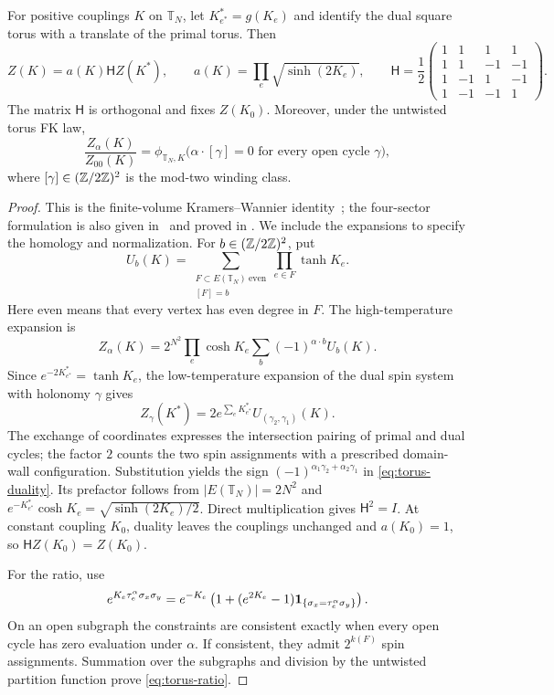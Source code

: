 \begin{lemma}
\label{lem:torus-duality}
For positive couplings $K$ on $\mathbb T_N$, let
$K^*_{e^*}=g(K_e)$ and identify the dual square torus with a translate
of the primal torus. Then
\begin{equation}
 Z(K)=a(K)\mathsf H Z(K^*),\qquad
 a(K)=\prod_e\sqrt{\sinh(2K_e)},\qquad
 \mathsf H=\frac12
 \begin{pmatrix}
 1&1&1&1\\
 1&1&-1&-1\\
 1&-1&1&-1\\
 1&-1&-1&1
 \end{pmatrix}.
 \label{eq:torus-duality}
\end{equation}
The matrix $\mathsf H$ is orthogonal and fixes $Z(K_0)$. Moreover,
under the untwisted torus FK law,
\begin{equation}
 \frac{Z_\alpha(K)}{Z_{00}(K)}
 =\phi_{\mathbb T_N,K}
 \bigl(\alpha\cdot[\gamma]=0
          \text{ for every open cycle }\gamma\bigr),
 \label{eq:torus-ratio}
\end{equation}
where $[\gamma]\in(\mathbb Z/2\mathbb Z)^2$ is the mod-two winding class.
\end{lemma}

\begin{proof}
This is the finite-volume Kramers--Wannier identity~\cite{KW}; the
four-sector formulation is also given in~\cite{BS} and proved in
\cite[Section~8, Lemma ``The four torus partition functions'']{R}.
We include the expansions to specify the homology and normalization.
For $b\in(\mathbb Z/2\mathbb Z)^2$, put
\[
 U_b(K)=\sum_{\substack{F\subset E(\mathbb T_N)\ \mathrm{even}\\{}[F]=b}}
                        \prod_{e\in F}\tanh K_e.
\]
Here even means that every vertex has even degree in $F$. The
high-temperature expansion is
\[
 Z_\alpha(K)=2^{N^2}\prod_e\cosh K_e
                   \sum_b(-1)^{\alpha\cdot b}U_b(K).
\]
Since $e^{-2K^*_{e^*}}=\tanh K_e$, the low-temperature expansion of
the dual spin system with holonomy $\gamma$ gives
\[
 Z_\gamma(K^*)=2e^{\sum_eK^*_{e^*}}
                       U_{(\gamma_2,\gamma_1)}(K).
\]
The exchange of coordinates expresses the intersection pairing of
primal and dual cycles; the factor $2$ counts the two spin assignments
with a prescribed domain-wall configuration. Substitution yields the
sign $(-1)^{\alpha_1\gamma_2+\alpha_2\gamma_1}$ in
\eqref{eq:torus-duality}. Its prefactor follows from
$|E(\mathbb T_N)|=2N^2$ and
$e^{-K^*_{e^*}}\cosh K_e=\sqrt{\sinh(2K_e)/2}$.
Direct multiplication gives $\mathsf H^2=I$. At constant coupling
$K_0$, duality leaves the couplings unchanged and $a(K_0)=1$,
so $\mathsf HZ(K_0)=Z(K_0)$.

For the ratio, use
\[
 e^{K_e\tau_e^\alpha\sigma_x\sigma_y}
 =e^{-K_e}\left(1+(e^{2K_e}-1)
             \mathbf 1_{\{\sigma_x=\tau_e^\alpha\sigma_y\}}\right).
\]
On an open subgraph the constraints are consistent exactly when
every open cycle has zero evaluation under $\alpha$. If consistent,
they admit $2^{k(F)}$ spin assignments. Summation over the subgraphs
and division by the untwisted partition function prove
\eqref{eq:torus-ratio}.
\end{proof}


